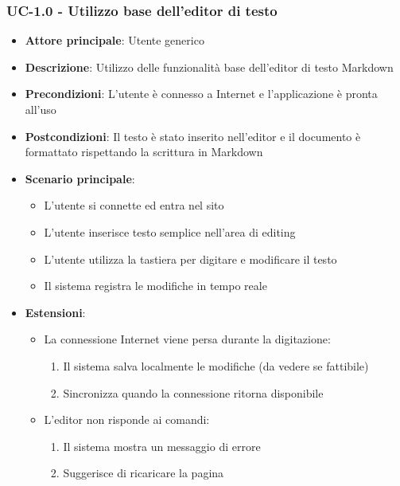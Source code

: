 \documentclass[11pt,a4paper]{article}
\begin{document}
\subsubsection{UC-1.0 - Utilizzo base dell'editor di testo}
\begin{itemize}
    \item \textbf{Attore principale}: Utente generico
    \item \textbf{Descrizione}: Utilizzo delle funzionalità base dell'editor di testo Markdown
    \item \textbf{Precondizioni}: L'utente è connesso a Internet e l'applicazione è pronta all'uso
    \item \textbf{Postcondizioni}: Il testo è stato inserito nell'editor e il documento è formattato rispettando la scrittura in Markdown
    \item \textbf{Scenario principale}:
        \begin{itemize}
            \item L'utente si connette ed entra nel sito
            \item L'utente inserisce testo semplice nell'area di editing
            \item L'utente utilizza la tastiera per digitare e modificare il testo
            \item Il sistema registra le modifiche in tempo reale
        \end{itemize}
    \item \textbf{Estensioni}:
        \begin{itemize}
            \item La connessione Internet viene persa durante la digitazione:
                \begin{enumerate}
                    \item Il sistema salva localmente le modifiche (da vedere se fattibile)
                    \item Sincronizza quando la connessione ritorna disponibile
                \end{enumerate}
            \item L'editor non risponde ai comandi:
                \begin{enumerate}
                    \item Il sistema mostra un messaggio di errore
                    \item Suggerisce di ricaricare la pagina
                \end{enumerate}
        \end{itemize}
\end{itemize}
\end{document}
